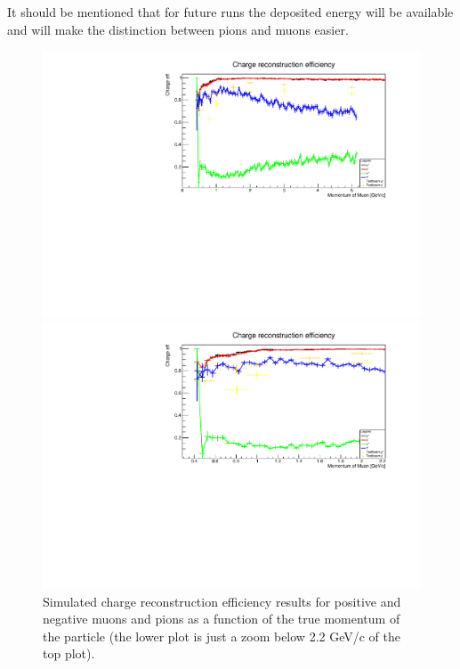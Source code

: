 It should be mentioned that for future runs the deposited energy will be available and will make the distinction between pions and muons easier.


\begin{figure}[h!]
\centering
\includegraphics[width=\textwidth]{figures/testbeam/TestBeam090318Plots/ChargeIDFullWPion.pdf}

\includegraphics[width=\textwidth]{figures/testbeam/TestBeam090318Plots/ChargeIDFullLowWPion.pdf}
\caption{Simulated charge reconstruction efficiency results for positive and negative muons and pions as a function of the true momentum of the particle (the lower plot is just a zoom below 2.2 GeV/c of the top plot).}
\label{fig:ChargeImprovedPion}
\end{figure}

